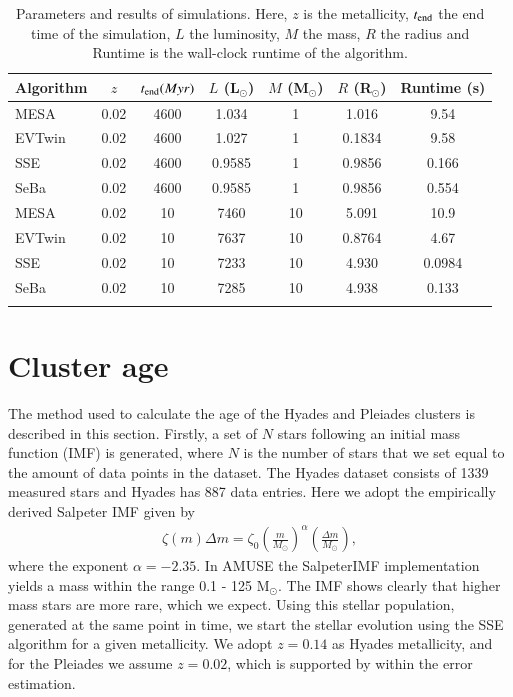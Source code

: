 \documentclass{aa}
\newcommand{\Sun}[0]{\ensuremath{_{\odot}}}
\begin{document}
\setlength\tabcolsep{2pt}
\begin{table}
    \caption[]{Parameters and results of simulations. Here, $z$ is the metallicity, $t_{\rm end}$ the end time of the simulation, $L$ the luminosity, $M$ the mass, $R$ the radius and Runtime is the wall-clock runtime of the algorithm.}
    \label{tab:parameterspace}
    \begin{tabular}{lcccccc}
        \hline
        \noalign{\smallskip}
        Algorithm & $z$ & $t_{\rm end} (Myr)$ & $L$ (L\Sun) & $M$ (M\Sun) & $R$ (R\Sun) & Runtime (s) \\
        \hline
        \noalign{\smallskip}
        MESA & 0.02 & 4600 & 1.034 & 1 & 1.016 & 9.54 \\
        EVTwin  & 0.02 & 4600 & 1.027 & 1 & 0.1834 & 9.58 \\
        SSE & 0.02 & 4600 & 0.9585 & 1 & 0.9856 & 0.166 \\
        SeBa & 0.02 & 4600 & 0.9585 & 1 & 0.9856 & 0.554 \\
        MESA & 0.02 & 10 & 7460 & 10 & 5.091 & 10.9 \\
        EVTwin & 0.02 & 10 & 7637 & 10 & 0.8764 & 4.67  \\
        SSE & 0.02 & 10 & 7233 & 10 & 4.930 & 0.0984 \\
        SeBa & 0.02 & 10 & 7285 & 10 & 4.938 & 0.133 \\
        \hline
        \noalign{\smallskip}
        \noalign{\smallskip}
    \end{tabular}
\end{table}

\section{Cluster age}\label{sec:isochrones}
The method used to calculate the age of the Hyades and Pleiades clusters is described in this section. Firstly, a set of $N$ stars following an initial mass function (IMF) is generated, where $N$ is the number of stars that we set equal to the amount of data points in the dataset. The Hyades dataset consists of 1339 measured stars and Hyades has 887 data entries. Here we adopt the empirically derived Salpeter IMF \citep{1955ApJ...121..161S} given by
\begin{eqnarray}
    \zeta(m) \Delta m = \zeta_0 \left(\frac{m}{M\Sun}\right)^{\alpha} \left(\frac{\Delta m}{M\Sun}\right),
\end{eqnarray} where the exponent $\alpha = -2.35$. In AMUSE the SalpeterIMF implementation yields a mass within the range 0.1 - 125 M\Sun. The IMF shows clearly that higher mass stars are more rare, which we expect. Using this stellar population, generated at the same point in time, we start the stellar evolution using the SSE algorithm for a given metallicity. We adopt $z = 0.14$ \citep{1998A&A...331...81P} as Hyades metallicity, and for the Pleiades we assume $z = 0.02$, which is supported by \citet{2009AJ....138.1292S} within the error estimation.
\end{document}
